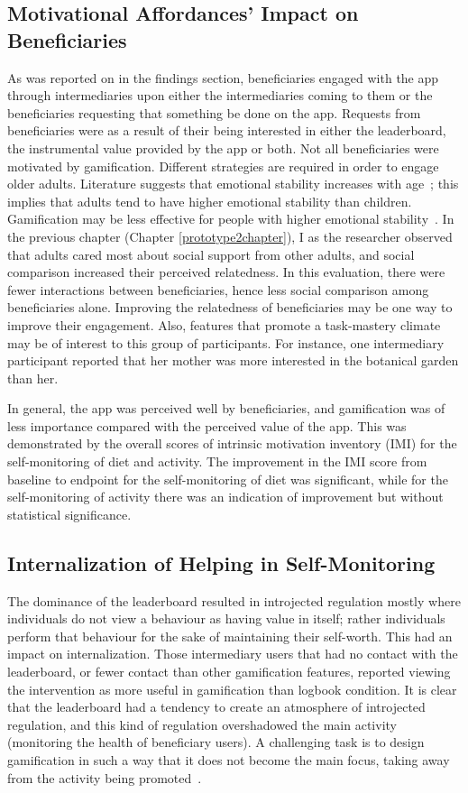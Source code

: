 \subsection{Motivational Affordances' Impact on Beneficiaries}
As was reported on in the findings section, beneficiaries engaged with the app through intermediaries upon either the intermediaries coming to them or the beneficiaries requesting that something be done on the app. Requests from beneficiaries were as a result of their being interested in either the leaderboard, the instrumental value provided by the app or both. Not all beneficiaries were motivated by gamification. Different strategies are required in order to engage older adults. Literature suggests that emotional stability increases with age~\citep{carstensen2011emotional}; this implies that adults tend to have higher emotional stability than children. Gamification may be less effective for people with higher emotional stability~\citep{jia2016personality}. In the previous chapter (Chapter \ref{prototype2chapter}), I as the researcher observed that adults cared most about social support from other adults, and social comparison increased their perceived relatedness. In this evaluation, there were fewer interactions between beneficiaries, hence less social comparison among beneficiaries alone. Improving the relatedness of beneficiaries may be one way to improve their engagement. Also, features that promote a task-mastery climate may be of interest to this group of participants. For instance, one intermediary participant reported that her mother was more interested in the botanical garden than her. 

In general, the app was perceived well by beneficiaries, and gamification was of less importance compared with the perceived value of the app. This was demonstrated by the overall scores of intrinsic motivation inventory (IMI) for the self-monitoring of diet and activity. The improvement in the IMI score from baseline to endpoint for the self-monitoring of diet was significant, while for the self-monitoring of activity there was an indication of improvement but without statistical significance.
\subsection{Internalization of Helping in Self-Monitoring}
The dominance of the leaderboard resulted in introjected regulation mostly where individuals do not view a behaviour as  having value in itself; rather individuals perform that behaviour for the sake of maintaining their self-worth. This had an impact on internalization. Those intermediary users that had no contact with the leaderboard, or fewer contact than other gamification features, reported viewing the intervention as more useful in gamification than logbook condition. It is clear that the leaderboard had a tendency to create an atmosphere of introjected regulation, and this kind of regulation overshadowed the main activity (monitoring the health of beneficiary users). A challenging task is to design gamification in such a way that it does not become the main focus, taking away from the activity being promoted~\citep{knaving2013designing}.

